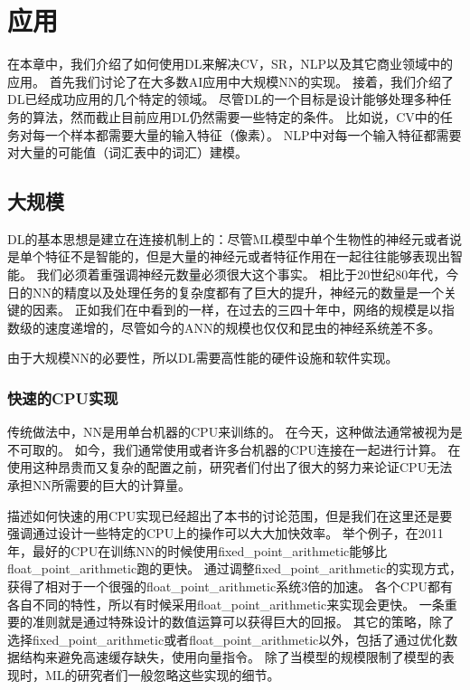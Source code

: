 \chapter{应用}
\label{chap:applications}

在本章中，我们介绍了如何使用\gls{DL}来解决\gls{CV}，\gls{SR}，\gls{NLP}以及其它商业领域中的应用。
首先我们讨论了在大多数\gls{AI}应用中大规模\gls{NN}的实现。
接着，我们介绍了\gls{DL}已经成功应用的几个特定的领域。
尽管\gls{DL}的一个目标是设计能够处理多种任务的算法，然而截止目前应用\gls{DL}仍然需要一些特定的条件。
比如说，\gls{CV}中的任务对每一个样本都需要大量的输入特征（像素）。
\gls{NLP}中对每一个输入特征都需要对大量的可能值（词汇表中的词汇）建模。

\section{大规模}
\label{sec:large_scale_deep_learning}

\gls{DL}的基本思想是建立在连接机制上的：尽管\gls{ML}模型中单个生物性的神经元或者说是单个特征不是智能的，但是大量的神经元或者特征作用在一起往往能够表现出智能。
我们必须着重强调神经元数量必须很大这个事实。
相比于20世纪80年代，今日的\gls{NN}的精度以及处理任务的复杂度都有了巨大的提升，神经元的数量是一个关键的因素。
正如我们在中看到的一样，在过去的三四十年中，网络的规模是以指数级的速度递增的，尽管如今的\gls{ANN}的规模也仅仅和昆虫的神经系统差不多。

由于大规模\gls{NN}的必要性，所以\gls{DL}需要高性能的硬件设施和软件实现。

\subsection{快速的CPU实现}
\label{sec:fast_cpu_implementations}

传统做法中，\gls{NN}是用单台机器的CPU来训练的。
在今天，这种做法通常被视为是不可取的。
如今，我们通常使用或者许多台机器的CPU连接在一起进行计算。
在使用这种昂贵而又复杂的配置之前，研究者们付出了很大的努力来论证CPU无法承担\gls{NN}所需要的巨大的计算量。


描述如何快速的用CPU实现已经超出了本书的讨论范围，但是我们在这里还是要强调通过设计一些特定的CPU上的操作可以大大加快效率。
举个例子，在2011年，最好的CPU在训练\gls{NN}的时候使用\gls{fixed_point_arithmetic}能够比\gls{float_point_arithmetic}跑的更快。
通过调整\gls{fixed_point_arithmetic}的实现方式，\citet{Vanhoucke-et-al-2011}获得了相对于一个很强的\gls{float_point_arithmetic}系统3倍的加速。
各个CPU都有各自不同的特性，所以有时候采用\gls{float_point_arithmetic}来实现会更快。
一条重要的准则就是通过特殊设计的数值运算可以获得巨大的回报。
其它的策略，除了选择\gls{fixed_point_arithmetic}或者\gls{float_point_arithmetic}以外，包括了通过优化数据结构来避免高速缓存缺失，使用向量指令。
除了当模型的规模限制了模型的表现时，\gls{ML}的研究者们一般忽略这些实现的细节。

